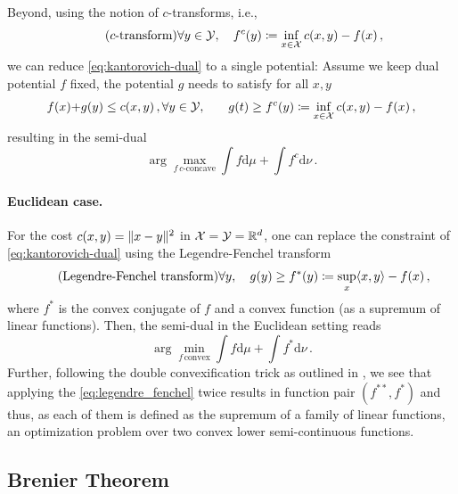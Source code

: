 Beyond, using the notion of $c$-transforms, i.e.,
\begin{equation}
	\tag{$c$-transform}
	\forall y \in \mathcal{Y}, \quad f^c(y) \coloneqq \inf _{x \in \mathcal{X}} c(x, y)-f(x) \,,
\end{equation}
we can reduce \eqref{eq:kantorovich-dual} to a single potential: Assume we keep dual potential $f$ fixed, the potential $g$ needs to satisfy for all $x, y$
\begin{align*}
	f(x) + &g(y) \le c(x, y)\,,
	\forall y \in \mathcal{Y}, \quad  &g(t) \ge f^c(y) \coloneqq \inf _{x \in \mathcal{X}} c(x, y) - f(x)\,,
\end{align*}
resulting in the semi-dual
\begin{equation}\label{eq:semi-dual}
\arg\!\!\max_{f\, c\text{-concave}} \int f \textrm{d}\mu + \int f^c\textrm{d}\nu\,.
\end{equation}

\paragraph{Euclidean case.} For the cost $c(x, y) = \lVert x-y\rVert^2$ in ${\mathcal{X}} = {\mathcal{Y}} = \mathbb{R}^d$, one can replace the constraint of \eqref{eq:kantorovich-dual} using the Legendre-Fenchel transform
\begin{equation} \label{eq:legendre_fenchel}
	\tag{Legendre-Fenchel transform}
	\forall y, \quad g(y) \geq f^*(y) \coloneqq \sup _x \langle x, y\rangle-f(x)\,,
\end{equation}
where $f^*$ is the convex conjugate of $f$ and a convex function (as a supremum of linear functions). Then, the semi-dual in the Euclidean setting reads
\begin{equation} \label{eq:dual-cvx}
	\arg\!\!\min_{f\, \text{convex}} \int f \textrm{d}\mu + \int f^*\textrm{d}\nu\,.
\end{equation}
Further, following the double convexification trick as outlined in \citet[Lemma 2.10]{villani2021topics}, we see that applying the \ref{eq:legendre_fenchel} twice results in function pair $(f^{**},f^{*})$ and thus, as each of them is defined as the supremum of a family of linear functions, an optimization problem over two convex lower semi-continuous functions.

\subsection{Brenier Theorem} \label{sec:background_brenier}


